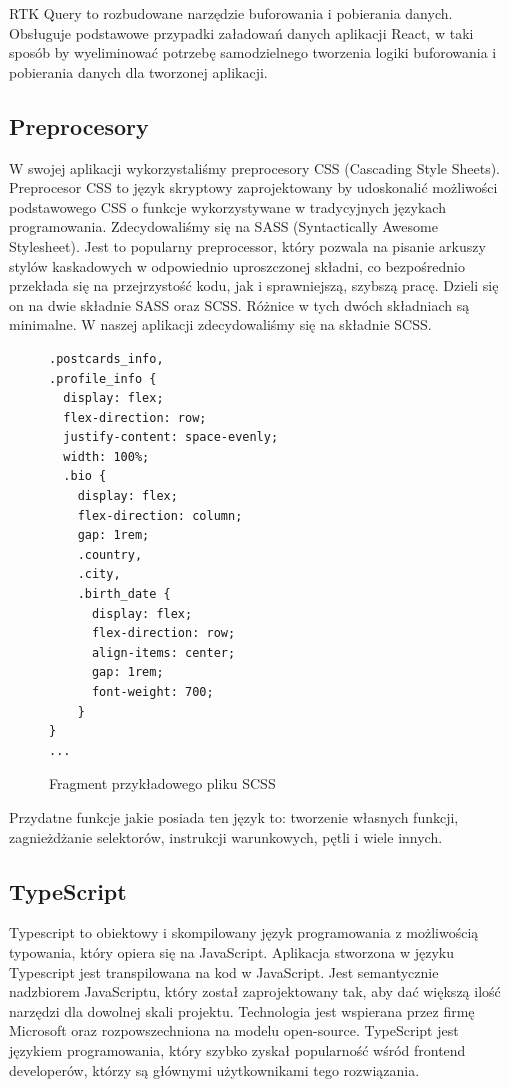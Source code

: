 \documentclass[a4paper,twoside,12pt]{book}
\begin{document}
RTK Query to rozbudowane narzędzie buforowania i pobierania danych. Obsługuje podstawowe przypadki załadowań danych aplikacji React, w taki  sposób by wyeliminować potrzebę samodzielnego tworzenia logiki buforowania i pobierania danych dla tworzonej aplikacji.
\subsection{Preprocesory}
W swojej aplikacji wykorzystaliśmy preprocesory CSS (Cascading Style Sheets). Preprocesor CSS to język skryptowy zaprojektowany by udoskonalić możliwości podstawowego CSS o funkcje wykorzystywane w tradycyjnych językach programowania. Zdecydowaliśmy się na SASS (Syntactically Awesome Stylesheet). Jest to popularny preprocessor, który pozwala na pisanie arkuszy stylów kaskadowych w odpowiednio uproszczonej składni, co bezpośrednio przekłada się na przejrzystość kodu, jak i sprawniejszą, szybszą pracę. Dzieli się on na dwie składnie SASS oraz SCSS. Różnice w tych dwóch składniach są minimalne. W naszej aplikacji zdecydowaliśmy się na składnie SCSS. 
\newpage
\begin{figure}[H]
    \begin{lstlisting}
.postcards_info,
.profile_info {
  display: flex;
  flex-direction: row;
  justify-content: space-evenly;
  width: 100%;
  .bio {
    display: flex;
    flex-direction: column;
    gap: 1rem;
    .country,
    .city,
    .birth_date {
      display: flex;
      flex-direction: row;
      align-items: center;
      gap: 1rem;
      font-weight: 700;
    }
}
...
    \end{lstlisting}
    \caption{Fragment przykładowego pliku SCSS}
    \label{fig:pseudokod:listings}
\end{figure}
Przydatne funkcje jakie posiada ten język to: tworzenie własnych funkcji, zagnieżdżanie selektorów, instrukcji warunkowych, pętli i wiele innych.
\subsection{TypeScript}
Typescript to obiektowy i skompilowany język programowania z możliwością typowania, który opiera się na JavaScript. Aplikacja stworzona  w języku Typescript jest transpilowana na kod w JavaScript. Jest semantycznie nadzbiorem JavaScriptu, który został zaprojektowany tak, aby dać większą ilość narzędzi dla dowolnej skali projektu. Technologia jest wspierana przez firmę Microsoft oraz rozpowszechniona na modelu open-source. TypeScript jest językiem programowania, który szybko zyskał popularność wśród frontend developerów, którzy są głównymi użytkownikami tego rozwiązania.
\end{document}
